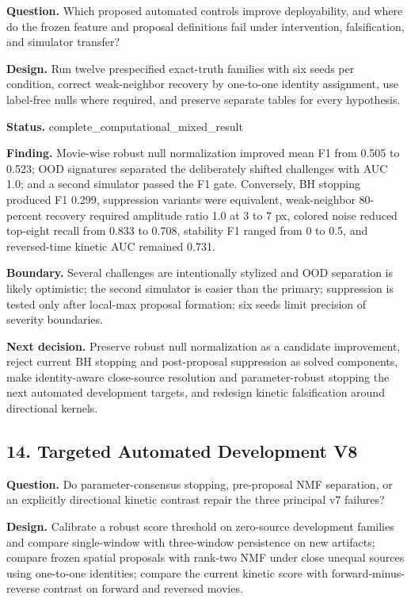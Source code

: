 \textbf{Question.} Which proposed automated controls improve deployability, and where do the frozen feature and proposal definitions fail under intervention, falsification, and simulator transfer?

\textbf{Design.} Run twelve prespecified exact-truth families with six seeds per condition, correct weak-neighbor recovery by one-to-one identity assignment, use label-free nulls where required, and preserve separate tables for every hypothesis.

\textbf{Status.} complete\_computational\_mixed\_result

\textbf{Finding.} Movie-wise robust null normalization improved mean F1 from 0.505 to 0.523; OOD signatures separated the deliberately shifted challenges with AUC 1.0; and a second simulator passed the F1 gate. Conversely, BH stopping produced F1 0.299, suppression variants were equivalent, weak-neighbor 80-percent recovery required amplitude ratio 1.0 at 3 to 7 px, colored noise reduced top-eight recall from 0.833 to 0.708, stability F1 ranged from 0 to 0.5, and reversed-time kinetic AUC remained 0.731.

\textbf{Boundary.} Several challenges are intentionally stylized and OOD separation is likely optimistic; the second simulator is easier than the primary; suppression is tested only after local-max proposal formation; six seeds limit precision of severity boundaries.

\textbf{Next decision.} Preserve robust null normalization as a candidate improvement, reject current BH stopping and post-proposal suppression as solved components, make identity-aware close-source resolution and parameter-robust stopping the next automated development targets, and redesign kinetic falsification around directional kernels.

\subsection{14. Targeted Automated Development V8}

\textbf{Question.} Do parameter-consensus stopping, pre-proposal NMF separation, or an explicitly directional kinetic contrast repair the three principal v7 failures?

\textbf{Design.} Calibrate a robust score threshold on zero-source development families and compare single-window with three-window persistence on new artifacts; compare frozen spatial proposals with rank-two NMF under close unequal sources using one-to-one identities; compare the current kinetic score with forward-minus-reverse contrast on forward and reversed movies.

